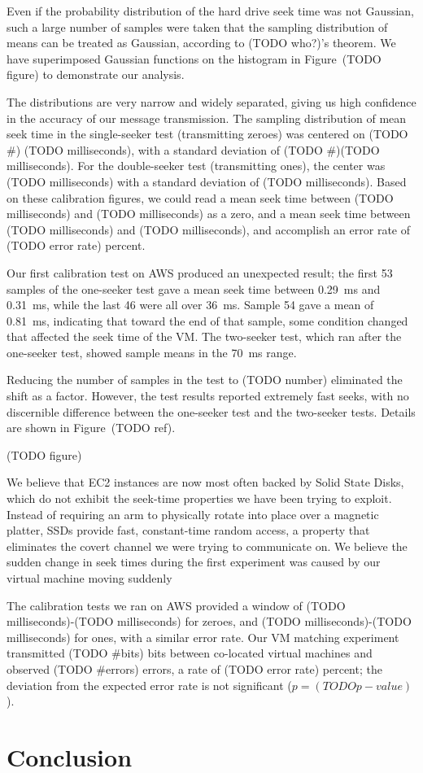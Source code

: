 \documentclass[conference]{IEEEtran}
\newcounter{todocnt}
\newcommand{\todo}[1]{\stepcounter{todocnt}{\tt {[#1]}} \marginpar{{$\blacksquare$ \thetodocnt}}}
\begin{document}
Even if the probability distribution of the hard drive seek time was not Gaussian, such a large number of samples were
  taken that the sampling distribution of means can be treated as Gaussian, according to (TODO who?)'s theorem.
We have superimposed Gaussian functions on the histogram in Figure~(TODO figure) to demonstrate our analysis.

The distributions are very narrow and widely separated, giving us high confidence in the accuracy of our message
  transmission.
The sampling distribution of mean seek time in the single-seeker test (transmitting zeroes) was centered on (TODO \#)
  (TODO milliseconds), with a standard deviation of (TODO \#)(TODO milliseconds).
For the double-seeker test (transmitting ones), the center was (TODO milliseconds) with a standard deviation of (TODO
  milliseconds).
Based on these calibration figures, we could read a mean seek time between (TODO milliseconds) and (TODO milliseconds)
  as a zero, and a mean seek time between (TODO milliseconds) and (TODO milliseconds), and accomplish an error rate of
  (TODO error rate) percent.

Our first calibration test on AWS produced an unexpected result; the first \num{53} samples of the one-seeker test gave
  a mean seek time between \SI{0.29}{ms} and \SI{0.31}{ms}, while the last \num{46} were all over \SI{36}{ms}.
Sample \num{54} gave a mean of \SI{0.81}{ms}, indicating that toward the end of that sample, some condition changed
  that affected the seek time of the VM.
The two-seeker test, which ran after the one-seeker test, showed sample means in the \SI{70}{ms} range.

Reducing the number of samples in the test to (TODO number) eliminated the shift as a factor.
However, the test results reported extremely fast seeks, with no discernible difference between the one-seeker test and
  the two-seeker tests.
Details are shown in Figure~(TODO ref).

(TODO figure)

We believe that EC2 instances are now most often backed by Solid State Disks, which do not exhibit the seek-time
  properties we have been trying to exploit.
Instead of requiring an arm to physically rotate into place over a magnetic platter, SSDs provide fast, constant-time
  random access, a property that eliminates the covert channel we were trying to communicate on.
We believe the sudden change in seek times during the first experiment was caused by our virtual machine moving suddenly

The calibration tests we ran on AWS provided a window of (TODO milliseconds)-(TODO milliseconds) for zeroes, and (TODO
  milliseconds)-(TODO milliseconds) for ones, with a similar error rate.
Our VM matching experiment transmitted (TODO \#bits) bits between co-located virtual machines and observed
  (TODO \#errors) errors, a rate of (TODO error rate) percent; the deviation from the expected error rate is not
  significant ($p = (TODO p-value)$).

\section{Conclusion}
\todo{TBD last}



%
\end{document}
